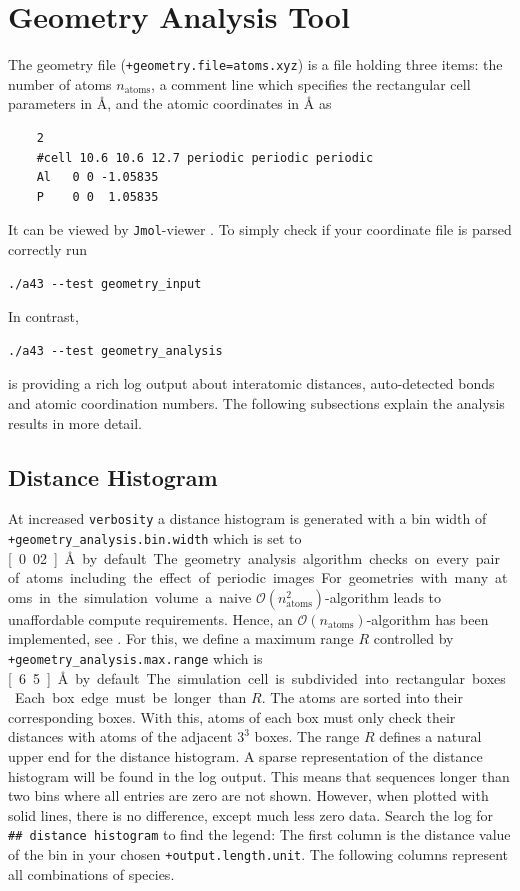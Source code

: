 \documentclass[oribibl]{llncs}
\newcommand{\um}[1]{_{\mathrm{#1}}}
\newcommand{\ttt}[1]{\texttt{#1}}
\begin{document}
\section{Geometry Analysis Tool} \label{sec:geometry-analysis}
%
The geometry file (\ttt{+geometry.file=atoms.xyz}) is a file
holding three items:
the number of atoms $n\um{atoms}$, 
a comment line which specifies the rectangular cell parameters in \AA{}, 
and the atomic coordinates in \AA{} as
\begin{verbatim}
    2
    #cell 10.6 10.6 12.7 periodic periodic periodic
    Al   0 0 -1.05835
    P    0 0  1.05835
\end{verbatim}
It can be viewed by \ttt{Jmol}-viewer \cite{jmol-software}.
%
\noindent
To simply check if your coordinate file is parsed correctly run
\begin{verbatim}
./a43 --test geometry_input
\end{verbatim}
In contrast,
\begin{verbatim}
./a43 --test geometry_analysis
\end{verbatim}
is providing a rich log output about interatomic distances,
auto-detected bonds and atomic coordination numbers.
The following subsections explain the analysis results in more detail.

\subsection{Distance Histogram} \label{sec:distance-histogram}
%
At increased \ttt{verbosity} a distance histogram is generated with
a bin width of \ttt{+geometry\_analysis.bin.width} which is set to \unit[0.02]{\AA} by default.
The geometry analysis algorithm checks on every pair of atoms
including the effect of periodic images.
For geometries with many atoms in the simulation volume
a naive $\mathcal O(n\um{atoms}^2)$-algorithm 
leads to unaffordable compute requirements.
Hence, an $\mathcal O(n\um{atoms})$-algorithm has been implemented, see \cite{a43theory}.
For this, we define a maximum range $R$ controlled 
by \ttt{+geometry\_analysis.max.range} which is \unit[6.5]{\AA} by default.
The simulation cell is subdivided into rectangular boxes. 
Each box edge must be longer than $R$. 
The atoms are sorted into their corresponding boxes.
With this, atoms of each box must only check their distances 
with atoms of the adjacent $3^3$ boxes.
The range $R$ defines a natural upper end for the distance histogram.
A sparse representation of the distance histogram will be found in the log output.
This means that sequences longer than two bins where all entries are zero are not shown.
However, when plotted with solid lines, there is no difference, except much less zero data.
Search the log for \ttt{\#\# distance histogram} to find the legend:
The first column is the distance value of the bin in your chosen \ttt{+output.length.unit}.
The following columns represent all combinations of species.
\end{document}
